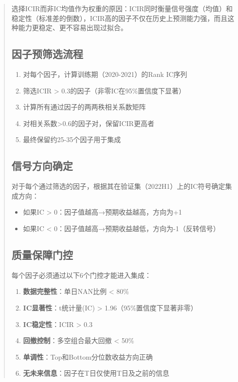 \documentclass[12pt,a4paper]{article}
\begin{document}
\begin{abstract}
选择ICIR而非IC均值作为权重的原因：ICIR同时衡量信号强度（均值）和稳定性（标准差的倒数），ICIR高的因子不仅在历史上预测能力强，而且这种能力更稳定、更不容易出现过拟合。

\subsection{因子预筛选流程}

\begin{enumerate}[label=Step \arabic*:]
    \item 对每个因子，计算训练期（2020-2021）的Rank IC序列
    \item 筛选ICIR > 0.3的因子（非零IC在95\%置信度下显著）
    \item 计算所有通过因子的两两秩相关系数矩阵
    \item 对相关系数>0.6的因子对，保留ICIR更高者
    \item 最终保留约25-35个因子用于集成
\end{enumerate}

\subsection{信号方向确定}

对于每个通过筛选的因子，根据其在验证集（2022H1）上的IC符号确定集成方向：
\begin{itemize}
    \item 如果IC > 0：因子值越高→预期收益越高，方向为+1
    \item 如果IC < 0：因子值越高→预期收益越低，方向为-1（反转信号）
\end{itemize}

\subsection{质量保障门控}

每个因子必须通过以下6个门控才能进入集成：
\begin{enumerate}[label=Gate \arabic*:]
    \item \textbf{数据完整性}：单日NAN比例 < 80\%
    \item \textbf{IC显著性}：t统计量(IC) > 1.96（95\%置信度下显著非零）
    \item \textbf{IC稳定性}：ICIR > 0.3
    \item \textbf{回撤控制}：多空组合最大回撤 < 50\%
    \item \textbf{单调性}：Top和Bottom分位数收益方向正确
    \item \textbf{无未来信息}：因子在T日仅使用T日及之前的信息
\end{enumerate}


\end{abstract}
\end{document}
